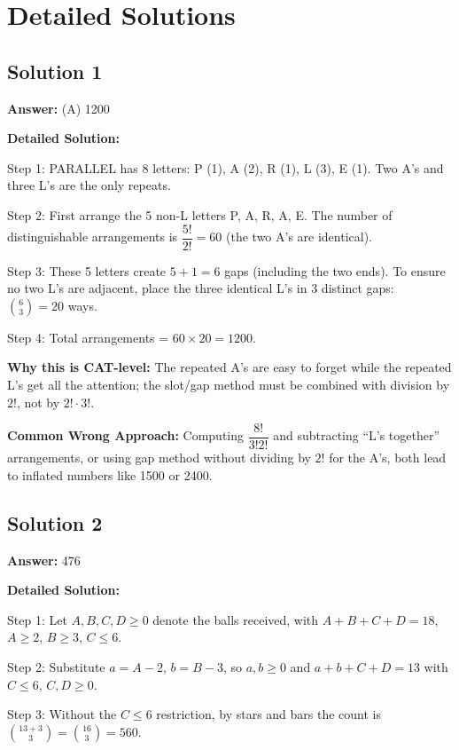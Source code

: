 \documentclass[11pt,a4paper]{article}
\begin{document}
\newpage

\section*{Detailed Solutions}

\subsection*{Solution 1}
\textbf{Answer:} (A) 1200

\textbf{Detailed Solution:}

Step 1: PARALLEL has 8 letters: P (1), A (2), R (1), L (3), E (1). Two A's and three L's are the only repeats.

Step 2: First arrange the 5 non-L letters P, A, R, A, E. The number of distinguishable arrangements is \(\dfrac{5!}{2!} = 60\) (the two A's are identical).

Step 3: These 5 letters create \(5 + 1 = 6\) gaps (including the two ends). To ensure no two L's are adjacent, place the three identical L's in 3 distinct gaps: \(\binom{6}{3} = 20\) ways.

Step 4: Total arrangements = \(60 \times 20 = 1200\).

\textbf{Why this is CAT-level:} The repeated A's are easy to forget while the repeated L's get all the attention; the slot/gap method must be combined with division by \(2!\), not by \(2! \cdot 3!\).

\textbf{Common Wrong Approach:} Computing \(\dfrac{8!}{3! 2!}\) and subtracting ``L's together'' arrangements, or using gap method without dividing by \(2!\) for the A's, both lead to inflated numbers like 1500 or 2400.

\subsection*{Solution 2}
\textbf{Answer:} 476

\textbf{Detailed Solution:}

Step 1: Let \(A, B, C, D \geq 0\) denote the balls received, with \(A + B + C + D = 18\), \(A \geq 2\), \(B \geq 3\), \(C \leq 6\).

Step 2: Substitute \(a = A - 2\), \(b = B - 3\), so \(a, b \geq 0\) and \(a + b + C + D = 13\) with \(C \leq 6\), \(C, D \geq 0\).

Step 3: Without the \(C \leq 6\) restriction, by stars and bars the count is \(\binom{13 + 3}{3} = \binom{16}{3} = 560\).
\end{document}

